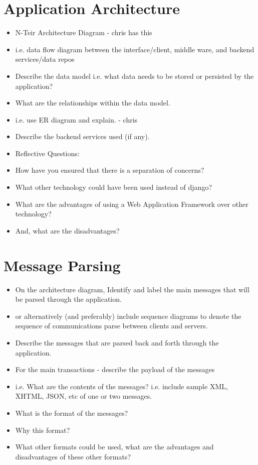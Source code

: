 \documentclass{sig-alt-release2}
\begin{document}
\section{Application Architecture}
\begin{itemize}

\item	N-Teir Architecture Diagram - chris has this

\item	i.e. data flow diagram between the interface/client, middle ware, and backend services/data repos

\item	Describe the data model i.e. what data needs to be stored or persisted by the application?

\item	What are the relationships within the data model.
\item	i.e. use ER diagram and explain. - chris 

\item	Describe the backend services used (if any).

\item	Reflective Questions: 
\item	How have you ensured that there is a separation of concerns? 
\item	What other technology could have been used instead of django? 
\item	What are the advantages of using a Web Application Framework over other technology? 
\item	And, what are the disadvantages?
\end{itemize}

\section{Message Parsing}
\begin{itemize}

\item	On the architecture diagram, Identify and label the main messages that will be parsed through the application.
\item	or alternatively (and preferably) include sequence diagrams to denote the sequence of communications parse between clients and servers.

\item	Describe the messages that are parsed back and forth through the application.

\item	For the main transactions - describe the payload of the messages 
\item	i.e. What are the contents of the messages? i.e. include sample XML, XHTML, JSON, etc of one or two messages.

\item	What is the format of the messages? 

\item	Why this format? 

\item	What other formats could be used, what are the advantages and disadvantages of these other formats?
\end{itemize}
\end{document}
